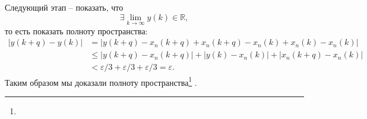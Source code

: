 Следующий этап -- показать, что
\begin{equation*}
    \exists \lim_{k \to \infty} y(k) \in \mathbb{R},
\end{equation*}
то есть показать полноту пространства:
\begin{align*}
    |y(k+q)-y(k)| 
    &= |y(k+q) - x_n (k+q) + x_n (k+q) - x_n (k) + x_n (k) - x_n (k)|\\
    &\leq |y(k+q)-x_n (k+q)| + |y(k) - x_n (k)| + |x_n (k+q) - x_n (k)| \\
    & < \varepsilon/3 + \varepsilon/3 + \varepsilon/3 = \varepsilon.
\end{align*}
Таким образом мы доказали полноту пространства\footnote{
} . 

